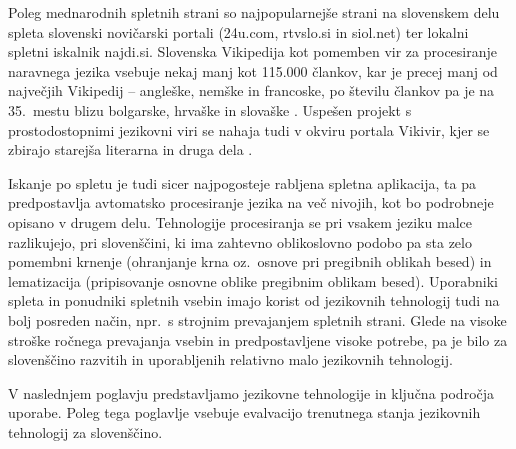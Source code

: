 \begin{multicols}{2}
Poleg mednarodnih spletnih strani so naj\-popularnejše strani na slovenskem delu spleta slovenski novičarski portali (24u.com, rtvslo.si in siol.net) ter lokalni spletni iskalnik najdi.si. Slovenska Vikipedija kot pomemben vir za procesiranje na\-ravnega jezika vsebuje nekaj manj kot 115.000 člankov, kar je precej manj od naj\-večjih Vikipedij – angleške, nemške in francoske, po številu člankov pa je na 35.~mestu blizu bolgarske, hrvaške in slovaške \cite{Wiki1}.  Uspešen projekt s prostodostopnimi jezikovni viri se nahaja tudi v okviru portala Vikivir, kjer se zbirajo starejša literarna in druga dela \cite{Wiki2}.  


Iskanje po spletu je tudi sicer naj\-pogosteje rab\-ljena spletna aplikacija, ta pa predpostav\-lja avtomatsko procesiranje jezika na več nivojih, kot bo podrobneje opisano v drugem delu. Tehnologije procesiranja se pri vsakem jeziku malce razlikujejo, pri slovenščini, ki ima zah\-tevno oblikoslovno podobo pa sta zelo pomembni krnenje (ohranjanje krna oz.~osnove pri pregibnih oblikah besed) in lematizacija (pripisovanje osnovne oblike pregibnim oblikam besed). Uporabniki spleta in ponudniki spletnih vsebin imajo korist od jezikovnih tehnologij tudi na bolj posreden način, npr.~s stroj\-nim prevajanjem spletnih strani. Glede na visoke stroške ročnega prevajanja vsebin in predpostav\-ljene visoke potrebe, pa je bilo za slovenščino razvitih in uporab\-ljenih relativno malo jezikovnih tehnologij. 

V naslednjem poglavju predstav\-ljamo jezikovne tehnologije in ključna področja uporabe. Poleg tega poglav\-lje vsebuje evalvacijo trenutnega stanja jezikovnih tehnologij za slovenščino.

\end{multicols}

\clearpage



